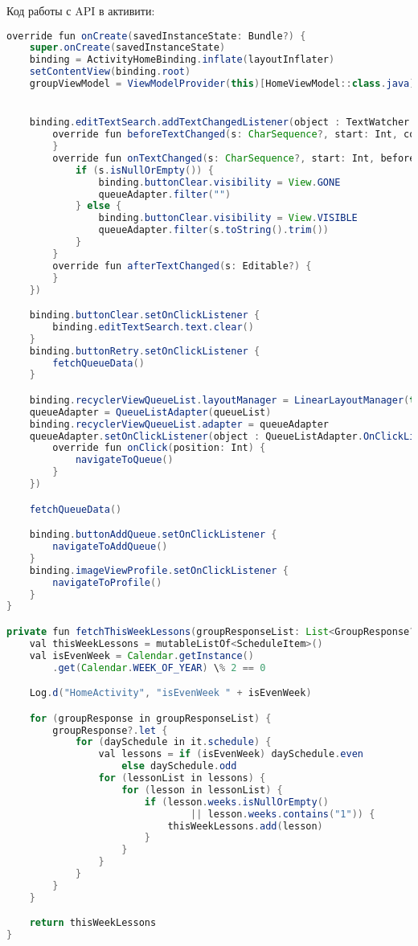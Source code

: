 Код работы с API в активити:
\begin{lstlisting}[language=Java]
override fun onCreate(savedInstanceState: Bundle?) {
	super.onCreate(savedInstanceState)
	binding = ActivityHomeBinding.inflate(layoutInflater)
	setContentView(binding.root)
	groupViewModel = ViewModelProvider(this)[HomeViewModel::class.java]


	binding.editTextSearch.addTextChangedListener(object : TextWatcher {
		override fun beforeTextChanged(s: CharSequence?, start: Int, count: Int, after: Int) {
		}
		override fun onTextChanged(s: CharSequence?, start: Int, before: Int, count: Int) {
			if (s.isNullOrEmpty()) {
				binding.buttonClear.visibility = View.GONE
				queueAdapter.filter("")
			} else {
				binding.buttonClear.visibility = View.VISIBLE
				queueAdapter.filter(s.toString().trim())
			}
		}
		override fun afterTextChanged(s: Editable?) {
		}
	})

	binding.buttonClear.setOnClickListener {
		binding.editTextSearch.text.clear()
	}
	binding.buttonRetry.setOnClickListener {
		fetchQueueData()
	}

	binding.recyclerViewQueueList.layoutManager = LinearLayoutManager(this)
	queueAdapter = QueueListAdapter(queueList)
	binding.recyclerViewQueueList.adapter = queueAdapter
	queueAdapter.setOnClickListener(object : QueueListAdapter.OnClickListener {
		override fun onClick(position: Int) {
			navigateToQueue()
		}
	})

	fetchQueueData()

	binding.buttonAddQueue.setOnClickListener {
		navigateToAddQueue()
	}
	binding.imageViewProfile.setOnClickListener {
		navigateToProfile()
	}
}

private fun fetchThisWeekLessons(groupResponseList: List<GroupResponse?>): List<ScheduleItem> {
	val thisWeekLessons = mutableListOf<ScheduleItem>()
	val isEvenWeek = Calendar.getInstance()
		.get(Calendar.WEEK_OF_YEAR) \% 2 == 0

	Log.d("HomeActivity", "isEvenWeek " + isEvenWeek)

	for (groupResponse in groupResponseList) {
		groupResponse?.let {
			for (daySchedule in it.schedule) {
				val lessons = if (isEvenWeek) daySchedule.even 
					else daySchedule.odd
				for (lessonList in lessons) {
					for (lesson in lessonList) {
						if (lesson.weeks.isNullOrEmpty()
								|| lesson.weeks.contains("1")) {
							thisWeekLessons.add(lesson)
						}
					}
				}
			}
		}
	}

	return thisWeekLessons
}


\end{lstlisting}
